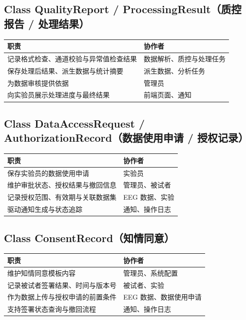 \subsection{Class QualityReport / ProcessingResult（质控报告 / 处理结果）}

\begin{longtable}{|p{84mm}|p{54mm}|}
\hline
\textbf{职责} & \textbf{协作者} \\
\hline
记录格式检查、通道校验与异常值检查结果 & 数据解析、质控与处理任务 \\
\hline
保存处理后结果、派生数据与统计摘要 & 派生数据、分析任务 \\
\hline
为数据审核提供依据 & 管理员 \\
\hline
向实验员展示处理进度与最终结果 & 前端页面、通知 \\
\hline
\end{longtable}

\subsection{Class DataAccessRequest / AuthorizationRecord（数据使用申请 / 授权记录）}

\begin{longtable}{|p{84mm}|p{54mm}|}
\hline
\textbf{职责} & \textbf{协作者} \\
\hline
保存实验员的数据使用申请 & 实验员 \\
\hline
维护审批状态、授权结果与撤回信息 & 管理员、被试者 \\
\hline
记录授权范围、有效期与关联数据集 & EEG 数据、实验 \\
\hline
驱动通知生成与状态追踪 & 通知、操作日志 \\
\hline
\end{longtable}

\subsection{Class ConsentRecord（知情同意）}

\begin{longtable}{|p{84mm}|p{54mm}|}
\hline
\textbf{职责} & \textbf{协作者} \\
\hline
维护知情同意模板内容 & 管理员、系统配置 \\
\hline
记录被试者签署结果、时间与版本号 & 被试者、实验 \\
\hline
作为数据上传与授权申请的前置条件 & EEG 数据、数据使用申请 \\
\hline
支持签署状态查询与撤回流程 & 通知、操作日志 \\
\hline
\end{longtable}

